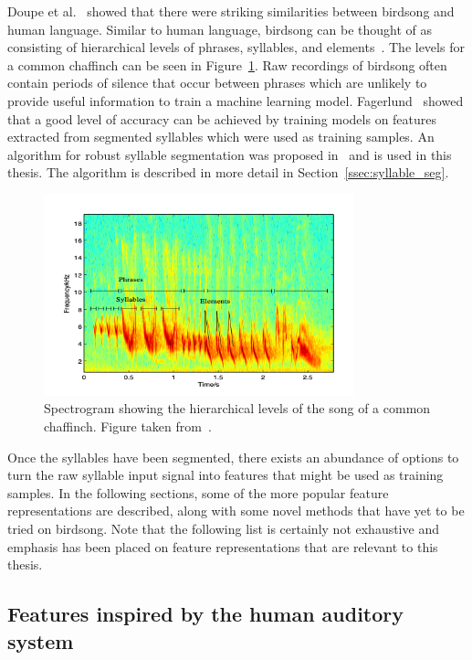 Doupe et al.~\cite{birdsongspeech} showed that there were striking similarities
between birdsong and human language. Similar to human language, birdsong can be
thought of as consisting of hierarchical levels of phrases, syllables, and
elements~\cite{catchpole2003bird}. The levels for a common chaffinch can be seen
in Figure~\ref{fig:syllables}. Raw recordings of birdsong
often contain periods of silence that occur between phrases which are unlikely
to provide useful information to train a machine learning model.
Fagerlund~\cite{fagerlund2007bird} showed that a good level of accuracy can be
achieved by training models on features extracted from segmented syllables which
were used as training samples. An algorithm for robust syllable segmentation was
proposed in~\cite{fagerlund2004automatic} and is used in this thesis. The
algorithm is described in more detail in Section~\ref{ssec:syllable_seg}.

\begin{figure}[ht]
  \centering
  \includegraphics[width=0.8\textwidth]{figures/syllables.png}
  \caption{Spectrogram showing the hierarchical levels of the song of a common
  chaffinch. Figure taken from~\cite{fagerlund2004automatic}.}\label{fig:syllables}
\end{figure}

Once the syllables have been segmented, there exists an abundance of options to
turn the raw syllable input signal into features that might be used as training
samples. In the following sections, some of the more popular feature
representations are described, along with some novel methods that have yet to be
tried on birdsong. Note that the following list is certainly not exhaustive and
emphasis has been placed on feature representations that are relevant to this
thesis.

\subsection{Features inspired by the human auditory system}

